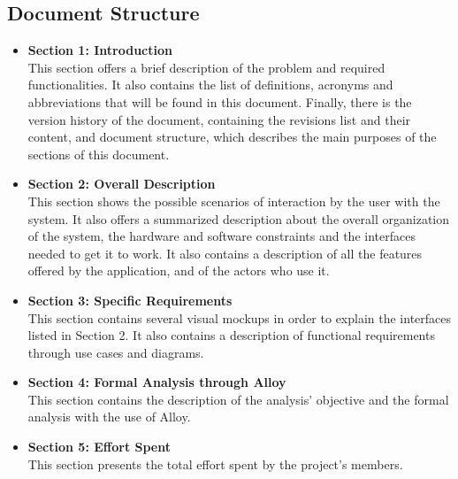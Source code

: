 \subsection{Document Structure}
\begin{itemize}
        \item \textbf{Section 1: Introduction} \\This section offers a brief description of the problem and required functionalities.
        It also contains the list of definitions, acronyms and abbreviations that will be found in this document.
        Finally, there is the version history of the document, containing the revisions list and their content, and document structure, 
        which describes the main purposes of the sections of this document.
        \item \textbf{Section 2: Overall Description} \\This section shows the possible scenarios of interaction by the user with the system. It also offers a summarized description about the overall organization of the system, the hardware and software constraints and the interfaces needed to get it to work.
        It also contains a description of all the features offered by the application, and of the actors who use it.
        
        \item \textbf{Section 3: Specific Requirements} \\This section contains several visual mockups in order to explain the interfaces listed in Section 2. 
        It also contains a description of functional requirements through use cases and diagrams.

        \item \textbf{Section 4: Formal Analysis through Alloy} \\This section contains the description of the analysis' objective and the formal analysis with the use of Alloy.
        \item \textbf{Section 5: Effort Spent} \\This section presents the total effort spent by the project's members.
\end{itemize}
